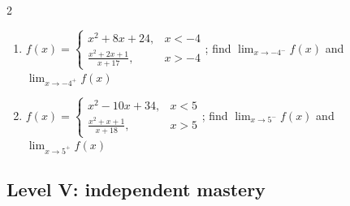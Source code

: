 \documentclass[11pt,oneside]{book}
\begin{document}
\begin{multicols}{2}
\begin{enumerate}[leftmargin=*,label=\textbf{\arabic*.},itemsep=0.65\baselineskip]
\item $f(x)=\begin{cases} x^{2} + 8 x + 24, & x<-4\\ \frac{x^{2} + 2 x + 1}{x + 17}, & x>-4 \end{cases}$; find $\lim_{x\to -4^-}f(x)$ and $\lim_{x\to -4^+}f(x)$
\item $f(x)=\begin{cases} x^{2} - 10 x + 34, & x<5\\ \frac{x^{2} + x + 1}{x + 18}, & x>5 \end{cases}$; find $\lim_{x\to 5^-}f(x)$ and $\lim_{x\to 5^+}f(x)$
\end{enumerate}
\end{multicols}
\subsection*{Level V: independent mastery}
\end{document}
